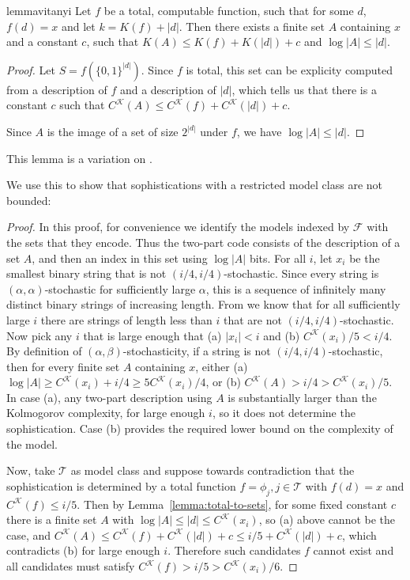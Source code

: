 \documentclass{style/llncs}
\newcommand{\T}{\mathscr T}
\newcommand{\F}{\mathscr F}
\newcommand{\K}{\mathscr K}
\begin{document}
\begin{restatable}{lemma}{vitanyi}
Let $f$ be a total, computable function, such that for some $d$, $f(d) = x$ and let $k = K(f) + |d|$. Then there exists a finite set $A$ containing $x$ and a constant $c$, such that $K(A) \leq K(f) + K(|d|) + c$ and $\log |A| \leq |d|$.\label{lemma:total-to-sets}
\end{restatable}
\begin{proof}
Let $S = f\left(\{0,1\}^{|d|}\right)$. Since $f$ is total, this set can be explicity computed from a description of $f$ and a description of $|d|$, which tells us that there is a constant $c$ such that $C^\K(A) \leq C^\K(f) + C^\K(|d|) + c$. 

Since $A$ is the image of a set of size $2^{|d|}$ under $f$, we have $\log |A| \leq |d|$.
\end{proof}
\noindent This lemma is a variation on \cite[Lemma~7.2]{vitanyi2004meaningful}. 

We use this to show that sophistications with a restricted model class are not bounded:
\dogfood*
\begin{proof}
In this proof, for convenience we identify the models indexed by $\F$ with the sets that they encode. Thus the two-part code consists of the description of a set $A$, and then an index in this set using $\log|A|$ bits.
For all $i$, let $x_i$ be the smallest binary string that is not $(i/4, i/4)$-stochastic. Since every string is $(\alpha,\alpha)$-stochastic for sufficiently large $\alpha$, this is a sequence of infinitely many distinct binary strings of increasing length. From \cite[Proposition~I.3 (b)]{gacs2001algorithmic} we know that for all sufficiently large $i$ there are strings of length less than $i$ that are not $(i/4, i/4)$-stochastic. Now pick any $i$ that is large enough that (a) $|x_i|<i$ and (b) $C^\K(x_i)/5 < i/4$. By definition of $(\alpha,\beta)$-stochasticity, if a string is not $(i/4,i/4)$-stochastic, then for every finite set $A$ containing $x$, either (a) $\log|A|\ge C^\K(x_i)+i/4\ge 5C^\K(x_i)/4$, or (b) $C^\K(A)>i/4>C^\K(x_i)/5$.
In case (a), any two-part description using $A$ is substantially larger than the Kolmogorov complexity, for large enough $i$, so it does not determine the sophistication. Case (b) provides the required lower bound on the complexity of the model.

Now, take $\T$ as model class and suppose towards contradiction that the sophistication is determined by a total function $f=\phi_j,j\in\T$ with $f(d)=x$ and $C^\K(f)\le i/5$. Then by Lemma~\ref{lemma:total-to-sets}, for some fixed constant $c$ there is a finite set $A$ with $\log|A|\le|d|\le C^\K(x_i)$, so (a) above cannot be the case, and $C^\K(A)\le C^\K(f)+C^\K(|d|)+c\le i/5+C^\K(|d|)+c$, which contradicts (b) for large enough $i$. Therefore such candidates $f$ cannot exist and all candidates must satisfy $C^\K(f)>i/5>C^\K(x_i)/6$.
\end{proof}
\end{document}
